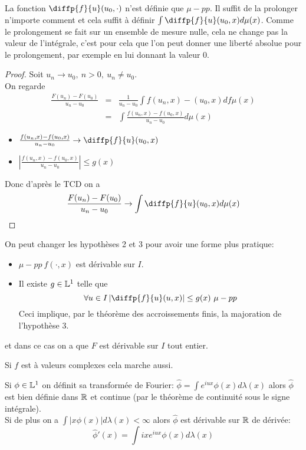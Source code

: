 \begin{remarque}
	La fonction $\diffp{f}{u}(u_0,\cdot)$ n'est définie que $\mu-pp$. Il suffit de
	la prolonger n'importe comment et cela suffit à définir $\int \diffp{f}{u}(u_0,x)d\mu(x)$.
	Comme le prolongement se fait sur un ensemble de mesure nulle, cela ne change pas la valeur de l'intégrale,
	c'est pour cela que l'on peut donner une liberté absolue pour le prolongement, par exemple en lui donnant la valeur 0.
\end{remarque}

\begin{proof}
	Soit $u_n \to u_0, \ n > 0, \ u_n \neq u_0$. \\
	On regarde
	\begin{eqnarray*}
		\frac{F(u_n)-F(u_0)}{u_n-u_0} &=& \frac{1}{u_n-u_0} \int f(u_n,x) -(u_0,x)df\mu(x) \\
		&=& \int \frac{f(u_n,x) - f(u_0,x)}{u_n-u_0}d\mu(x)
	\end{eqnarray*}
	\begin{itemize}
		\item $\frac{f(u_n,x)- f(u_0,x)}{u_n-u_0} \to \diffp{f}{u}(u_0,x)$
		\item $\left|\frac{f(u_n,x)- f(u_0,x)}{u_n-u_0} \right| \leq g(x)$
	\end{itemize}
	Donc d'après le TCD on a %
	$$ \frac{F(u_n)- F(u_0)}{u_n-u_0} \to \int \diffp{f}{u}(u_0,x) d\mu(x)$$

\end{proof}

\begin{remarque}
	On peut changer les hypothèses 2 et 3 pour avoir une forme plus pratique:
	\begin{itemize}
		\item $\mu-pp\  f(\cdot, x)$ est dérivable sur $I$.
		\item Il existe $g\in \mathbb{L}^1$ telle que
		      $$ \forall u\in I \left|\diffp{f}{u}(u,x)\right| \leq g(x) \ \mu-pp$$
		      Ceci implique, par le théorème des accroissements finis, la majoration de l'hypothèse 3.
	\end{itemize}
	et dans ce cas on a que $F$ est dérivable sur $I$ tout entier.
\end{remarque}

\begin{remarque}
	Si $f$ est à valeurs complexes cela marche aussi.
\end{remarque}


\begin{example}
	Si $\phi \in \mathbb{L}^1$ on définit sa transformée de Fourier:
	$\hat{\phi} = \int e^{iux}\phi(x) d\lambda(x)$
	alors $\hat{\phi}$ est bien définie dans $\mathbb{R}$ et continue (par le théorème de continuité sous le signe intégrale).\\
	Si de plus on a $\int |x\phi(x)|d\lambda(x)<\infty$ alors $\hat{\phi}$ est dérivable sur $\mathbb{R}$ de dérivée:
	$$\hat{\phi}'(x)= \int ixe^{iux}\phi(x)d\lambda(x)$$
\end{example}



